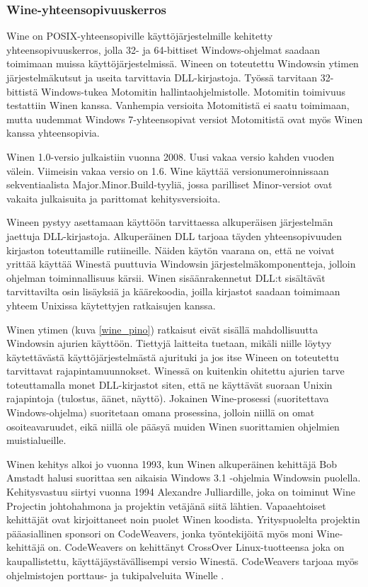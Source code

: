 \subsubsection{Wine-yhteensopivuuskerros}
Wine on POSIX-yhteensopiville käyttöjärjestelmille kehitetty yhteensopivuuskerros, jolla 32- ja 64-bittiset Windows-ohjelmat saadaan toimimaan muissa käyttöjärjestelmissä. Wineen on toteutettu Windowsin ytimen järjestelmäkutsut ja useita tarvittavia DLL-kirjastoja. Työssä tarvitaan 32-bittistä Windows-tukea Motomitin hallintaohjelmistolle. Motomitin toimivuus testattiin Winen kanssa. Vanhempia versioita Motomitistä ei saatu toimimaan, mutta uudemmat Windows 7-yhteensopivat versiot Motomitistä ovat myös Winen kanssa yhteensopivia.

Winen 1.0-versio julkaistiin vuonna 2008. Uusi vakaa versio kahden vuoden välein. Viimeisin vakaa versio on 1.6. Wine käyttää versionumeroinnissaan sekventiaalista Major.Minor.Build-tyyliä, jossa parilliset Minor-versiot ovat vakaita julkaisuita ja parittomat kehitysversioita.

Wineen pystyy asettamaan käyttöön tarvittaessa alkuperäisen järjestelmän jaettuja DLL-kirjastoja. Alkuperäinen DLL tarjoaa täyden yhteensopivuuden kirjaston toteuttamille rutiineille. Näiden käytön vaarana on, että ne voivat yrittää käyttää Winestä puuttuvia Windowsin järjestelmäkomponentteja, jolloin ohjelman toiminnallisuus kärsii. Winen sisäänrakennetut DLL:t sisältävät tarvittavilta osin lisäyksiä ja käärekoodia, joilla kirjastot saadaan toimimaan yhteem Unixissa käytettyjen ratkaisujen kanssa.

Winen ytimen (kuva \ref{wine_pino}) ratkaisut eivät sisällä mahdollisuutta Windowsin ajurien käyttöön. Tiettyjä laitteita tuetaan, mikäli niille löytyy käytettävästä käyttöjärjestelmästä ajurituki ja jos itse Wineen on toteutettu tarvittavat rajapintamuunnokset. Winessä on kuitenkin ohitettu ajurien tarve toteuttamalla monet DLL-kirjastot siten, että ne käyttävät suoraan Unixin rajapintoja (tulostus, äänet, näyttö). Jokainen Wine-prosessi (suoritettava Windows-ohjelma) suoritetaan omana prosessina, jolloin niillä on omat osoiteavaruudet, eikä niillä ole pääsyä muiden Winen suorittamien ohjelmien muistialueille.

Winen kehitys alkoi jo vuonna 1993, kun Winen alkuperäinen kehittäjä Bob Amstadt halusi suorittaa sen aikaisia Windows 3.1 -ohjelmia Windowsin puolella. Kehitysvastuu siirtyi vuonna 1994 Alexandre Julliardille, joka on toiminut Wine Projectin johtohahmona ja projektin vetäjänä siitä lähtien. Vapaaehtoiset kehittäjät ovat kirjoittaneet noin puolet Winen koodista. Yrityspuolelta projektin pääasiallinen sponsori on CodeWeavers, jonka työntekijöitä myös moni Wine-kehittäjä on. CodeWeavers on kehittänyt CrossOver Linux-tuotteensa joka on kaupallistettu, käyttäjäystävällisempi versio Winestä. CodeWeavers tarjoaa myös ohjelmistojen porttaus- ja tukipalveluita Winelle \cite{wine:codeweavers}.


